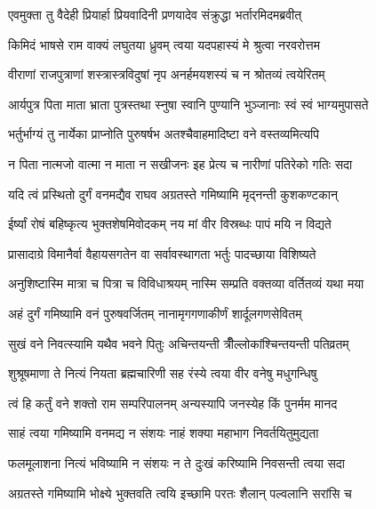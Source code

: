 
\twolineshloka
{एवमुक्ता तु वैदेही प्रियार्हा प्रियवादिनी}
{प्रणयादेव संक्रुद्धा भर्तारमिदमब्रवीत्} %

\twolineshloka
{किमिदं भाषसे राम वाक्यं लघुतया ध्रुवम्}
{त्वया यदपहास्यं मे श्रुत्वा नरवरोत्तम} %

\twolineshloka
{वीराणां राजपुत्राणां शस्त्रास्त्रविदुषां नृप}
{अनर्हमयशस्यं च न श्रोतव्यं त्वयेरितम्} %

\twolineshloka
{आर्यपुत्र पिता माता भ्राता पुत्रस्तथा स्नुषा}
{स्वानि पुण्यानि भुञ्जानाः स्वं स्वं भाग्यमुपासते} %

\twolineshloka
{भर्तुर्भाग्यं तु नार्येका प्राप्नोति पुरुषर्षभ}
{अतश्चैवाहमादिष्टा वने वस्तव्यमित्यपि} %

\twolineshloka
{न पिता नात्मजो वात्मा न माता न सखीजनः}
{इह प्रेत्य च नारीणां पतिरेको गतिः सदा} %

\twolineshloka
{यदि त्वं प्रस्थितो दुर्गं वनमद्यैव राघव}
{अग्रतस्ते गमिष्यामि मृद्नन्ती कुशकण्टकान्} %

\twolineshloka
{ईर्ष्यां रोषं बहिष्कृत्य भुक्तशेषमिवोदकम्}
{नय मां वीर विस्रब्धः पापं मयि न विद्यते} %

\twolineshloka
{प्रासादाग्रे विमानैर्वा वैहायसगतेन वा}
{सर्वावस्थागता भर्तुः पादच्छाया विशिष्यते} %

\twolineshloka
{अनुशिष्टास्मि मात्रा च पित्रा च विविधाश्रयम्}
{नास्मि सम्प्रति वक्तव्या वर्तितव्यं यथा मया} %

\twolineshloka
{अहं दुर्गं गमिष्यामि वनं पुरुषवर्जितम्}
{नानामृगगणाकीर्णं शार्दूलगणसेवितम्} %

\twolineshloka
{सुखं वने निवत्स्यामि यथैव भवने पितुः}
{अचिन्तयन्ती त्रीँल्लोकांश्चिन्तयन्ती पतिव्रतम्} %

\twolineshloka
{शुश्रूषमाणा ते नित्यं नियता ब्रह्मचारिणी}
{सह रंस्ये त्वया वीर वनेषु मधुगन्धिषु} %

\twolineshloka
{त्वं हि कर्तुं वने शक्तो राम सम्परिपालनम्}
{अन्यस्यापि जनस्येह किं पुनर्मम मानद} %

\twolineshloka
{साहं त्वया गमिष्यामि वनमद्य न संशयः}
{नाहं शक्या महाभाग निवर्तयितुमुद्यता} %

\twolineshloka
{फलमूलाशना नित्यं भविष्यामि न संशयः}
{न ते दुःखं करिष्यामि निवसन्ती त्वया सदा} %

\twolineshloka
{अग्रतस्ते गमिष्यामि भोक्ष्ये भुक्तवति त्वयि}
{इच्छामि परतः शैलान् पल्वलानि सरांसि च} %

